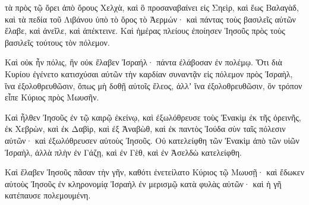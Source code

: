 {τὰ πρὸς τῷ ὄρει ἀπὸ ὄρους Χελχὰ, καὶ ὃ προσαναβαίνει εἰς Σηεὶρ, καὶ ἕως Βαλαγὰδ, καὶ τὰ πεδία τοῦ Λιβάνου ὑπὸ τὸ ὄρος τὸ Ἀερμών· καὶ πάντας τοὺς βασιλεῖς αὐτῶν ἔλαβε, καὶ ἀνεῖλε, καὶ ἀπέκτεινε.
Καὶ ἡμέρας πλείους ἐποίησεν Ἰησοῦς πρὸς τοὺς βασιλεῖς τούτους τὸν πόλεμον.
\par }{\PP {}Καὶ οὐκ ἦν πόλις, ἣν οὐκ ἔλαβεν Ἰσραήλ· πάντα ἐλάβοσαν ἐν πολέμῳ.
Ὅτι διὰ Κυρίου ἐγένετο κατισχύσαι αὐτῶν τὴν καρδίαν συναντᾷν εἰς πόλεμον πρὸς Ἰσραὴλ, ἵνα ἐξολοθρευθῶσιν, ὅπως μὴ δοθῇ αὐτοῖς ἔλεος, ἀλλʼ ἵνα ἐξολοθρευθῶσιν, ὃν τρόπον εἶπε Κύριος πρὸς Μωυσῆν.
\par }{\PP {}Καὶ ἦλθεν Ἰησοῦς ἐν τῷ καιρῷ ἐκείνῳ, καὶ ἐξωλόθρευσε τοὺς Ἐνακὶμ ἐκ τῆς ὀρεινῆς, ἐκ Χεβρὼν, καὶ ἐκ Δαβὶρ, καὶ ἐξ Ἀναβὼθ, καὶ ἐκ παντὸς Ἰούδα σὺν ταῖς πόλεσιν αὐτῶν· καὶ ἐξωλόθρευσεν αὐτοὺς Ἰησοῦς.
Οὐ κατελείφθη τῶν Ἐνακὶμ ἀπὸ τῶν υἱῶν Ἰσραὴλ, ἀλλὰ πλὴν ἐν Γάζῃ, καὶ ἐν Γὲθ, καὶ ἐν Ἀσελδὼ κατελείφθη.
\par }{\PP {}Καὶ ἔλαβεν Ἰησοῦς πᾶσαν τὴν γῆν, καθότι ἐνετείλατο Κύριος τῷ Μωυσῇ· καὶ ἔδωκεν αὐτοὺς Ἰησοῦς ἐν κληρονομίᾳ Ἰσραὴλ ἐν μερισμῷ κατὰ φυλὰς αὐτῶν· καὶ ἡ γῆ κατέπαυσε πολεμουμένη.

}
